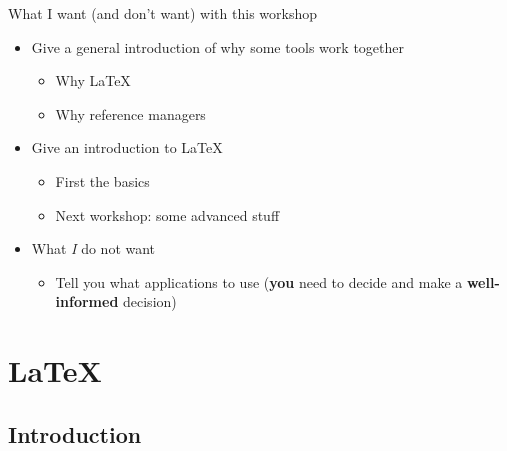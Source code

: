 \documentclass[ignorenonframetext,]{beamer}
\begin{document}
\begin{frame}{What I want (and don't want) with this workshop}

\begin{itemize}
\item
  Give a general introduction of why some tools work together

  \begin{itemize}
  \itemsep1pt\parskip0pt
  \item
    Why \LaTeX
  \item
    Why reference managers
  \end{itemize}
\item
  Give an introduction to \LaTeX

  \begin{itemize}
  \itemsep1pt\parskip0pt
  \item
    First the basics
  \item
    Next workshop: some advanced stuff
  \end{itemize}
\item
  What \emph{I} do not want

  \begin{itemize}
  \itemsep1pt\parskip0pt
  \item
    Tell you what applications to use (\textbf{you} need to decide and
    make a \textbf{well-informed} decision)
  \end{itemize}
\end{itemize}

\end{frame}

\section{\LaTeX}\label{section}

\subsection{Introduction}\label{introduction-2}
\end{document}
